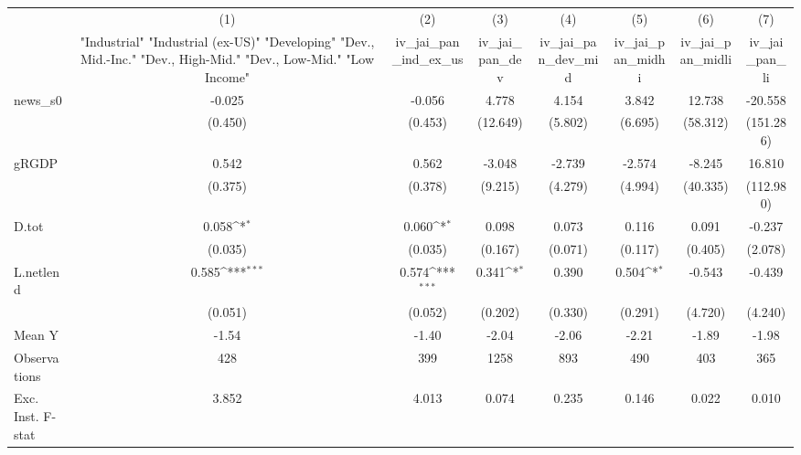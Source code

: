 {
\def\sym#1{\ifmmode^{#1}\else\(^{#1}\)\fi}
\begin{tabular}{l*{7}{c}}
\toprule
            &\multicolumn{1}{c}{(1)}&\multicolumn{1}{c}{(2)}&\multicolumn{1}{c}{(3)}&\multicolumn{1}{c}{(4)}&\multicolumn{1}{c}{(5)}&\multicolumn{1}{c}{(6)}&\multicolumn{1}{c}{(7)}\\
            &\multicolumn{1}{c}{ "Industrial" "Industrial (ex-US)" "Developing" "Dev., Mid.-Inc." "Dev., High-Mid."  "Dev., Low-Mid." "Low Income" }&\multicolumn{1}{c}{iv\_jai\_pan\_ind\_ex\_us}&\multicolumn{1}{c}{iv\_jai\_pan\_dev}&\multicolumn{1}{c}{iv\_jai\_pan\_dev\_mid}&\multicolumn{1}{c}{iv\_jai\_pan\_midhi}&\multicolumn{1}{c}{iv\_jai\_pan\_midli}&\multicolumn{1}{c}{iv\_jai\_pan\_li}\\
\midrule
news\_s0     &      -0.025         &      -0.056         &       4.778         &       4.154         &       3.842         &      12.738         &     -20.558         \\
            &     (0.450)         &     (0.453)         &    (12.649)         &     (5.802)         &     (6.695)         &    (58.312)         &   (151.286)         \\
\addlinespace
gRGDP       &       0.542         &       0.562         &      -3.048         &      -2.739         &      -2.574         &      -8.245         &      16.810         \\
            &     (0.375)         &     (0.378)         &     (9.215)         &     (4.279)         &     (4.994)         &    (40.335)         &   (112.980)         \\
\addlinespace
D.tot       &       0.058\sym{*}  &       0.060\sym{*}  &       0.098         &       0.073         &       0.116         &       0.091         &      -0.237         \\
            &     (0.035)         &     (0.035)         &     (0.167)         &     (0.071)         &     (0.117)         &     (0.405)         &     (2.078)         \\
\addlinespace
L.netlend   &       0.585\sym{***}&       0.574\sym{***}&       0.341\sym{*}  &       0.390         &       0.504\sym{*}  &      -0.543         &      -0.439         \\
            &     (0.051)         &     (0.052)         &     (0.202)         &     (0.330)         &     (0.291)         &     (4.720)         &     (4.240)         \\
\midrule
Mean Y      &       -1.54         &       -1.40         &       -2.04         &       -2.06         &       -2.21         &       -1.89         &       -1.98         \\
Observations&         428         &         399         &        1258         &         893         &         490         &         403         &         365         \\
Exc. Inst. F-stat&       3.852         &       4.013         &       0.074         &       0.235         &       0.146         &       0.022         &       0.010         \\
\bottomrule
\end{tabular}
}
